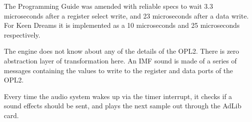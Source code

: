\documentclass[book.tex]{subfiles}
\begin{document}
\par
The Programming Guide was amended with reliable specs to wait 3.3 microseconds after a register select write, and 23 microseconds after a data write. For Keen Dreams it is implemented as a 10 microseconds and 25 microseconds respectively.
\par
\begin{minipage}{\textwidth}

\end{minipage}
\par

The engine does not know about any of the details of the OPL2. There is zero abstraction layer of transformation here. An IMF sound is made of a series of messages containing the values to write to the register and data ports of the OPL2.\\

\par
Every time the audio system wakes up via the timer interrupt, it checks if a sound effects should be sent, and plays the next sample out through the AdLib card.\\
\end{document}
